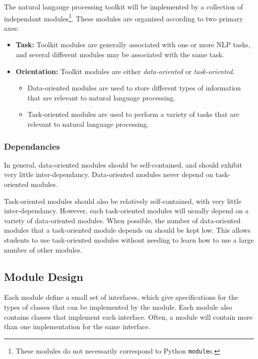 \documentclass{article}
\begin{document}
The natural langauge processing toolkit will be implemented by a
collection of independant modules\footnote{These modules do not
necessarily correspond to Python \texttt{module}s.}.  These modules are
organized according to two primary axes:

\begin{itemize}
  \item \textbf{Task:} Toolkit modules are generally associated with
  one or more NLP tasks, and several different modules may be
  associated with the same task.

  \item \textbf{Orientation:} Toolkit modules are either
  \emph{data-oriented} or \emph{task-oriented}.

  \begin{itemize}
    \item Data-oriented modules are used to store different types of
    information that are relevant to natural language processing.
    \item Task-oriented modules are used to perform a variety of tasks 
    that are relevant to natural language processing.
  \end{itemize}
\end{itemize}

\subsubsection{Dependancies}

In general, data-oriented modules should be self-contained, and should
exhibit very little inter-dependancy.  Data-oriented modules never
depend on task-oriented modules.

Task-oriented modules should also be relatively self-contained, with
very little inter-dependancy.  However, each task-oriented modules
will usually depend on a variety of data-oriented modules.  When
possible, the number of data-oriented modules that a task-oriented
module depends on should be kept low.  This allows students to use
task-oriented modules without needing to learn how to use a large
number of other modules.

\subsection{Module Design}

Each module define a small set of interfaces, which give
specifications for the types of classes that can be implemented by the
module.  Each module also contains classes that implement each
interface.  Often, a module will contain more than one implementation
for the same interface.
\end{document}
